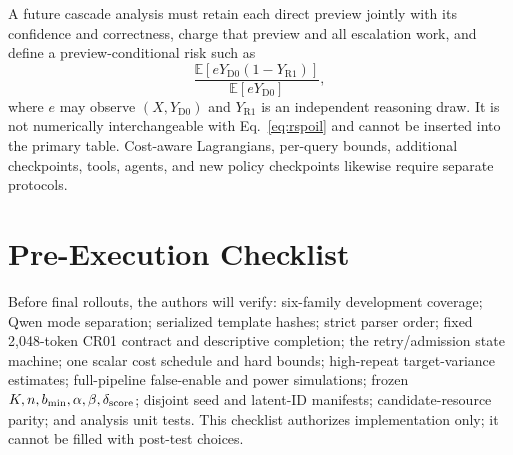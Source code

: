 \documentclass{article}
\newcommand{\D}{\ensuremath{\mathrm{D}}}
\newcommand{\Rpol}{\ensuremath{\mathrm{R}}}
\newcommand{\1}{\mathbb{I}}
\newcommand{\E}{\mathbb{E}}
\begin{document}
A future cascade analysis must retain each direct preview jointly with its confidence and correctness, charge that preview and all escalation work, and define a preview-conditional risk such as
\[
 \frac{\E[eY_{\D0}(1-Y_{\Rpol1})]}{\E[eY_{\D0}]},
\]
where $e$ may observe $(X,Y_{\D0})$ and $Y_{\Rpol1}$ is an independent reasoning draw. It is not numerically interchangeable with Eq.~\ref{eq:rspoil} and cannot be inserted into the primary table. Cost-aware Lagrangians, per-query bounds, additional checkpoints, tools, agents, and new policy checkpoints likewise require separate protocols.

\section{Pre-Execution Checklist}
Before final rollouts, the authors will verify: six-family development coverage; Qwen mode separation; serialized template hashes; strict parser order; fixed 2,048-token CR01 contract and descriptive completion; the retry/admission state machine; one scalar cost schedule and hard bounds; high-repeat target-variance estimates; full-pipeline false-enable and power simulations; frozen $K,n,b_{\min},\alpha,\beta,\delta_{\rm score}$; disjoint seed and latent-ID manifests; candidate-resource parity; and analysis unit tests. This checklist authorizes implementation only; it cannot be filled with post-test choices.
\end{document}

